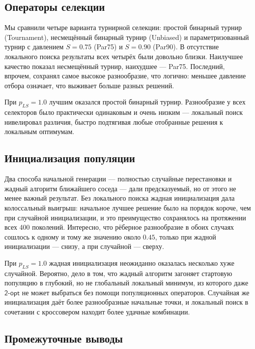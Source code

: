 \documentclass[a4paper,12pt]{article}
\begin{document}
\subsection{Операторы селекции}

Мы сравнили четыре варианта турнирной селекции: простой бинарный турнир (Tournament), несмещённый бинарный турнир (Unbiased) и параметризованный турнир с давлением $S=0.75$ (Par75) и $S=0.90$ (Par90). В отсутствие локального поиска результаты всех четырёх были довольно близки. Наилучшее качество показал несмещённый турнир, наихудшее --- Par75. Последний, впрочем, сохранял самое высокое разнообразие, что логично: меньшее давление отбора означает, что выживает больше разных решений.

При $p_{LS}=1.0$ лучшим оказался простой бинарный турнир. Разнообразие у всех селекторов было практически одинаковым и очень низким --- локальный поиск нивелировал различия, быстро подтягивая любые отобранные решения к локальным оптимумам.

\subsection{Инициализация популяции}

Два способа начальной генерации --- полностью случайные перестановки и жадный алгоритм ближайшего соседа --- дали предсказуемый, но от этого не менее важный результат. Без локального поиска жадная инициализация дала колоссальный выигрыш: начальное лучшее решение было на порядок короче, чем при случайной инициализации, и это преимущество сохранялось на протяжении всех 400 поколений. Интересно, что рёберное разнообразие в обоих случаях сошлось к одному и тому же значению около $0.45$, только при жадной инициализации --- снизу, а при случайной --- сверху.

При $p_{LS}=1.0$ жадная инициализация неожиданно оказалась несколько хуже случайной. Вероятно, дело в том, что жадный алгоритм загоняет стартовую популяцию в глубокий, но не глобальный локальный минимум, из которого даже $\mathsf{2\mbox{-}opt}$ не может выбраться без помощи популяционных операторов. Случайная же инициализация даёт более разнообразные начальные точки, и локальный поиск в сочетании с кроссовером находит более удачные комбинации.

\subsection{Промежуточные выводы}
\end{document}
